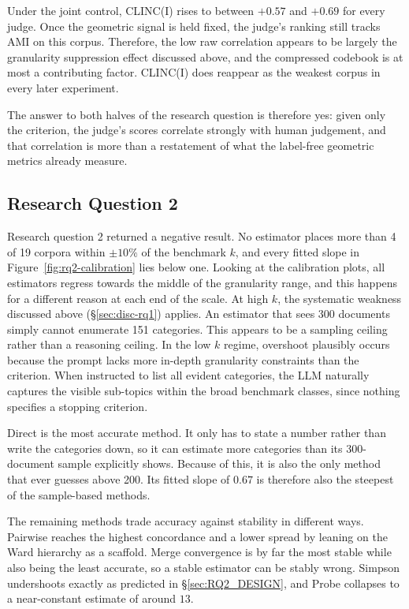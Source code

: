 \documentclass[11pt,a4paper,oneside]{report}
\begin{document}
Under the joint control, CLINC(I) rises to between $+0.57$
and $+0.69$ for every judge. Once the geometric signal is held fixed, the
judge's ranking still tracks AMI on this corpus. Therefore, the low raw correlation
appears to be largely the granularity suppression effect discussed above, and the
compressed codebook is at most a contributing factor. CLINC(I) does reappear
as the weakest corpus in every later experiment.

The answer to both halves of the research question is therefore yes:
given only the criterion, the judge's scores correlate strongly with
human judgement, and that correlation is more than a restatement of what
the label-free geometric metrics already measure.

\subsection{Research Question 2}

Research question 2 returned a negative result. No estimator places more than 4 of 19 corpora within $\pm 10\%$ of the benchmark $k$, and every fitted slope in Figure~\ref{fig:rq2-calibration} lies below one. Looking at the calibration plots, all estimators regress towards the middle of the granularity range, and this happens for a different reason at each end of the scale. At high $k$, the systematic weakness discussed above (\S\ref{sec:disc-rq1}) applies. An estimator that sees 300 documents simply cannot enumerate 151 categories. This appears to be a sampling ceiling rather than a reasoning ceiling. In the low $k$ regime, overshoot plausibly occurs because the prompt lacks more in-depth granularity constraints than the criterion. When instructed to list all evident categories, the LLM naturally captures the visible sub-topics within the broad benchmark classes, since nothing specifies a stopping criterion.

Direct is the most accurate method. It only has to state a number rather than write the categories down, so it can estimate more categories than its 300-document
sample explicitly shows. Because of this, it is also the only method that ever guesses above 200. Its fitted slope of $0.67$ is therefore also the steepest of the sample-based methods. 

The remaining methods trade accuracy against stability in different ways. Pairwise reaches the highest concordance and a lower spread by leaning on the Ward hierarchy as a scaffold. Merge convergence is by far the most stable while also being the least accurate, so a stable estimator can be stably wrong.
Simpson undershoots exactly as predicted in \S\ref{sec:RQ2_DESIGN}, and
Probe collapses to a near-constant estimate of around $13$. 
\end{document}

